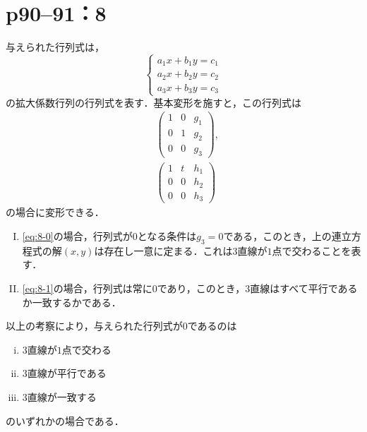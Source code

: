 \documentclass[a4paper,10pt,fleqn]{ltjsarticle}
\begin{document}
\newpage


\section*{p90--91：8}

\begin{tleftbar}
    与えられた行列式は，
    \[
        \begin{cases}
            a_1 x + b_1 y =c_1 \\
            a_2 x + b_2 y =c_2 \\
            a_3 x + b_3 y =c_3
        \end{cases}
    \]
    の拡大係数行列の行列式を表す．基本変形を施すと，この行列式は
    \begin{align}
         & \begin{pmatrix}
               1 & 0 & g_1 \\
               0 & 1 & g_2 \\
               0 & 0 & g_3
           \end{pmatrix}
        \label{eq:8-0}
        ,                 \\
         & \begin{pmatrix}
               1 & t & h_1 \\
               0 & 0 & h_2 \\
               0 & 0 & h_3
           \end{pmatrix}
        \label{eq:8-1}
    \end{align}
    の場合に変形できる．

    \begin{enumerate}[(I)]
        \item \eqref{eq:8-0}の場合，行列式が$0$となる条件は$g_3 =0$である，このとき，上の連立方程式の解$(x,y)$は存在し一意に定まる．これは$3$直線が$1$点で交わることを表す．
        \item \eqref{eq:8-1}の場合，行列式は常に$0$であり，このとき，3直線はすべて平行であるか一致するかである．
    \end{enumerate}

    以上の考察により，与えられた行列式が$0$であるのは
    \begin{enumerate}[(i)]
        \item 3直線が$1$点で交わる
        \item 3直線が平行である
        \item 3直線が一致する
    \end{enumerate}
    のいずれかの場合である．
\end{tleftbar}
\end{document}
